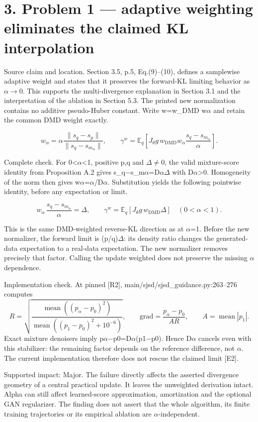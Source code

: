 \documentclass[10pt]{article}
\begin{document}
\section*{3. Problem 1 — adaptive weighting eliminates the claimed KL interpolation}
Source claim and location. Section 3.5, p.5, Eq.(9)–(10), defines a samplewise adaptive weight and states that it preserves the forward-KL limiting behavior as \(\alpha\)\(\to\)0. This supports the multi-divergence explanation in Section 3.1 and the interpretation of the ablation in Section 5.3. The printed new normalization contains no additive pseudo-Huber constant. Write w=w\_DMD w\(\alpha\) and retain the common DMD weight exactly.\par
\[w_\alpha=\alpha\frac{\|s_q-s_p\|}{\|s_q-s_{m_\alpha}\|},\qquad
\gamma^w=\mathbb E_q\!\left[J_\theta g\, w_{\mathrm{DMD}}w_\alpha\frac{s_q-s_{m_\alpha}}{\alpha}\right].\]\par
Complete check. For 0<\(\alpha\)<1, positive p,q and \(\Delta\)\(\ne\)0, the valid mixture-score identity from Proposition A.2 gives s\_q\(-\)s\_m\(\alpha\)=D\(\alpha\)\(\Delta\) with D\(\alpha\)>0. Homogeneity of the norm then gives w\(\alpha\)=\(\alpha\)/D\(\alpha\). Substitution yields the following pointwise identity, before any expectation or limit.\par
\[w_\alpha\,\frac{s_q-s_{m_\alpha}}{\alpha}=\Delta,\qquad
\gamma^w=\mathbb E_q[J_\theta g\,w_{\mathrm{DMD}}\Delta]\quad(0<\alpha<1).\]\par
This is the same DMD-weighted reverse-KL direction as at \(\alpha\)=1. Before the new normalizer, the forward limit is (p/q)\(\Delta\): its density ratio changes the generated-data expectation to a real-data expectation. The new normalizer removes precisely that factor. Calling the update weighted does not preserve the missing \(\alpha\) dependence.\par
Implementation check. At pinned [R2], main/sjsd/sjsd\_guidance.py:263–276 computes \[R=\sqrt{\frac{\operatorname{mean}((p_\alpha-p_0)^2)}
                   {\operatorname{mean}((p_1-p_0)^2+10^{-6})}},
 \qquad \mathrm{grad}=\frac{p_\alpha-p_0}{A R},
 \qquad A=\operatorname{mean}|p_1|.\] Exact mixture denoisers imply p\(\alpha\)\(-\)p0=D\(\alpha\)(p1\(-\)p0). Hence D\(\alpha\) cancels even with this stabilizer: the remaining factor depends on the reference difference, not \(\alpha\). The current implementation therefore does not rescue the claimed limit [E2].\par
Supported impact: Major. The failure directly affects the asserted divergence geometry of a central practical update. It leaves the unweighted derivation intact. Alpha can still affect learned-score approximation, amortization and the optional GAN regularizer. The finding does not assert that the whole algorithm, its finite training trajectories or its empirical ablation are \(\alpha\)-independent.\par
\end{document}

